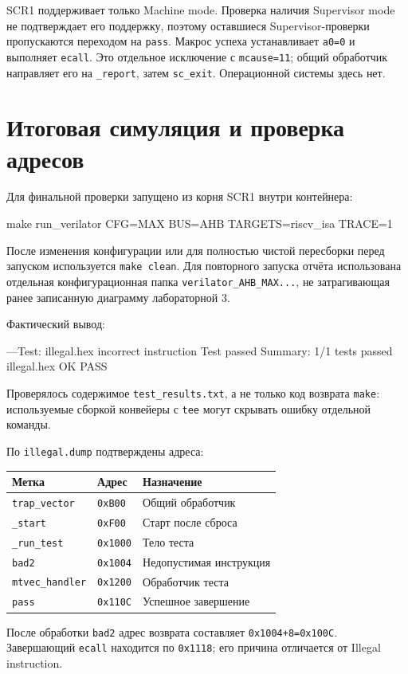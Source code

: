 \documentclass[12pt,a4paper]{article}
\begin{document}
SCR1 поддерживает только Machine mode. Проверка наличия Supervisor mode
не подтверждает его поддержку, поэтому оставшиеся Supervisor-проверки
пропускаются переходом на \texttt{pass}.
Макрос успеха устанавливает \texttt{a0=0} и выполняет \texttt{ecall}.
Это отдельное исключение с \texttt{mcause=11}; общий обработчик направляет
его на \texttt{\_report}, затем \texttt{sc\_exit}. Операционной системы здесь нет.

\section{Итоговая симуляция и проверка адресов}
Для финальной проверки запущено из корня SCR1 внутри контейнера:
\begin{Code}
make run_verilator CFG=MAX BUS=AHB TARGETS=riscv_isa TRACE=1
\end{Code}
После изменения конфигурации или для полностью чистой пересборки перед
запуском используется \texttt{make clean}. Для повторного запуска отчёта
использована отдельная конфигурационная папка \texttt{verilator\_AHB\_MAX...},
не затрагивающая ранее записанную диаграмму лабораторной 3.

Фактический вывод:
\begin{Code}
---Test: illegal.hex
incorrect instruction
Test passed
Summary: 1/1 tests passed
illegal.hex    OK    PASS
\end{Code}
Проверялось содержимое \texttt{test\_results.txt}, а не только код возврата
\texttt{make}: используемые сборкой конвейеры с \texttt{tee} могут скрывать
ошибку отдельной команды.

По \texttt{illegal.dump} подтверждены адреса:
\begin{center}
\begin{tabular}{lll}
\toprule
Метка & Адрес & Назначение \\
\midrule
\texttt{trap\_vector} & \texttt{0xB00} & Общий обработчик \\
\texttt{\_start} & \texttt{0xF00} & Старт после сброса \\
\texttt{\_run\_test} & \texttt{0x1000} & Тело теста \\
\texttt{bad2} & \texttt{0x1004} & Недопустимая инструкция \\
\texttt{mtvec\_handler} & \texttt{0x1200} & Обработчик теста \\
\texttt{pass} & \texttt{0x110C} & Успешное завершение \\
\bottomrule
\end{tabular}
\end{center}
После обработки \texttt{bad2} адрес возврата составляет
\texttt{0x1004+8=0x100C}. Завершающий \texttt{ecall} находится по
\texttt{0x1118}; его причина отличается от Illegal instruction.
\end{document}
